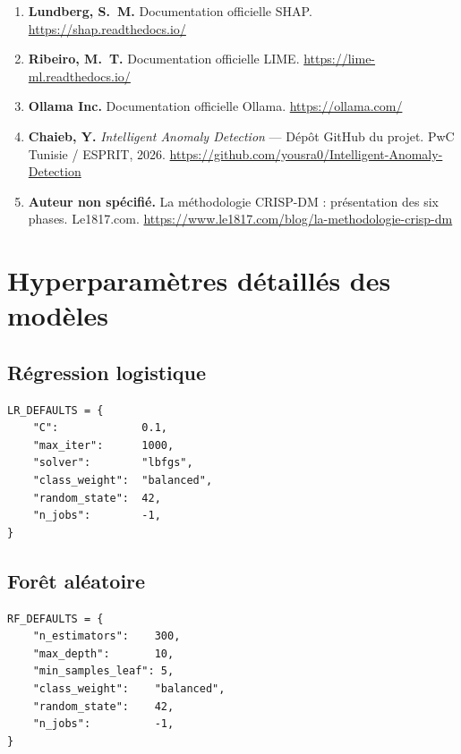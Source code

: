 \documentclass[12pt,a4paper,twoside]{report}
\begin{document}
\begin{enumerate}
  \item \textbf{Lundberg, S.~M.} Documentation officielle SHAP.
    \url{https://shap.readthedocs.io/}

  \item \textbf{Ribeiro, M.~T.} Documentation officielle LIME.
    \url{https://lime-ml.readthedocs.io/}

  \item \textbf{Ollama Inc.} Documentation officielle Ollama.
    \url{https://ollama.com/}

  \item \textbf{Chaieb, Y.} \textit{Intelligent Anomaly Detection} --- Dépôt GitHub
    du projet. PwC Tunisie / ESPRIT, 2026.
    \url{https://github.com/yousra0/Intelligent-Anomaly-Detection}

  \item \textbf{Auteur non spécifié.} La méthodologie CRISP-DM : présentation des six
    phases. Le1817.com. \url{https://www.le1817.com/blog/la-methodologie-crisp-dm}

\end{enumerate}

\appendix

\chapter{Hyperparamètres détaillés des modèles}

\section{Régression logistique}

\begin{lstlisting}[caption={Hyperparamètres LR (src/models/ml\_models.py)}]
LR_DEFAULTS = {
    "C":             0.1,
    "max_iter":      1000,
    "solver":        "lbfgs",
    "class_weight":  "balanced",
    "random_state":  42,
    "n_jobs":        -1,
}
\end{lstlisting}

\section{Forêt aléatoire}

\begin{lstlisting}[caption={Hyperparamètres RF (src/models/ml\_models.py)}]
RF_DEFAULTS = {
    "n_estimators":    300,
    "max_depth":       10,
    "min_samples_leaf": 5,
    "class_weight":    "balanced",
    "random_state":    42,
    "n_jobs":          -1,
}
\end{lstlisting}
\end{document}
